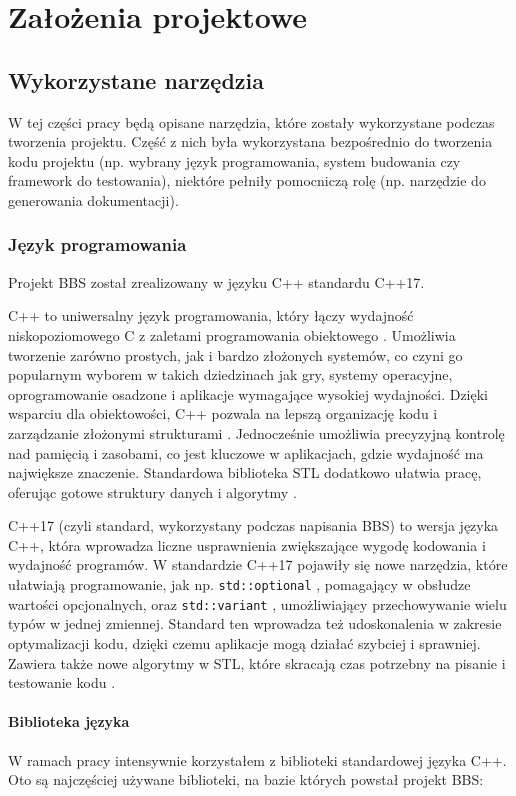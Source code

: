 \chapter{Założenia projektowe}
\section{Wykorzystane narzędzia}
W tej części pracy będą opisane narzędzia, które zostały wykorzystane podczas tworzenia projektu. Część z nich była wykorzystana bezpośrednio do tworzenia kodu projektu (np. wybrany język programowania, system budowania czy framework do testowania), niektóre pełniły pomocniczą rolę (np. narzędzie do generowania dokumentacji).

\subsection{Język programowania}
Projekt BBS został zrealizowany w języku C++ standardu C++17.

C++ to uniwersalny język programowania, który łączy wydajność niskopoziomowego C z zaletami programowania obiektowego \cite{cpp}. Umożliwia tworzenie zarówno prostych, jak i bardzo złożonych systemów, co czyni go popularnym wyborem w takich dziedzinach jak gry, systemy operacyjne, oprogramowanie osadzone i aplikacje wymagające wysokiej wydajności. Dzięki wsparciu dla obiektowości, C++ pozwala na lepszą organizację kodu i zarządzanie złożonymi strukturami \cite{oop}. Jednocześnie umożliwia precyzyjną kontrolę nad pamięcią i zasobami, co jest kluczowe w aplikacjach, gdzie wydajność ma największe znaczenie. Standardowa biblioteka STL dodatkowo ułatwia pracę, oferując gotowe struktury danych i algorytmy \cite{cpp_reference}.

C++17 (czyli standard, wykorzystany podczas napisania BBS) to wersja języka C++, która wprowadza liczne usprawnienia zwiększające wygodę kodowania i wydajność programów. W standardzie C++17 pojawiły się nowe narzędzia, które ułatwiają programowanie, jak np. \texttt{std::optional} \cite{cpp_optional}, pomagający w obsłudze wartości opcjonalnych, oraz \texttt{std::variant} \cite{cpp_variant}, umożliwiający przechowywanie wielu typów w jednej zmiennej. Standard ten wprowadza też udoskonalenia w zakresie optymalizacji kodu, dzięki czemu aplikacje mogą działać szybciej i sprawniej. Zawiera także nowe algorytmy w STL, które skracają czas potrzebny na pisanie i testowanie kodu \cite{cpp17,cpp17_guide}.

\subsubsection{Biblioteka języka}
W ramach pracy intensywnie korzystałem z biblioteki standardowej języka C++. Oto są najczęściej używane biblioteki, na bazie których powstał projekt BBS:

